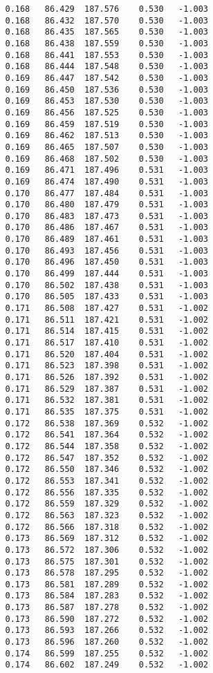\begin{verbatim}
   0.168   86.429  187.576    0.530   -1.003
   0.168   86.432  187.570    0.530   -1.003
   0.168   86.435  187.565    0.530   -1.003
   0.168   86.438  187.559    0.530   -1.003
   0.168   86.441  187.553    0.530   -1.003
   0.168   86.444  187.548    0.530   -1.003
   0.169   86.447  187.542    0.530   -1.003
   0.169   86.450  187.536    0.530   -1.003
   0.169   86.453  187.530    0.530   -1.003
   0.169   86.456  187.525    0.530   -1.003
   0.169   86.459  187.519    0.530   -1.003
   0.169   86.462  187.513    0.530   -1.003
   0.169   86.465  187.507    0.530   -1.003
   0.169   86.468  187.502    0.530   -1.003
   0.169   86.471  187.496    0.531   -1.003
   0.169   86.474  187.490    0.531   -1.003
   0.170   86.477  187.484    0.531   -1.003
   0.170   86.480  187.479    0.531   -1.003
   0.170   86.483  187.473    0.531   -1.003
   0.170   86.486  187.467    0.531   -1.003
   0.170   86.489  187.461    0.531   -1.003
   0.170   86.493  187.456    0.531   -1.003
   0.170   86.496  187.450    0.531   -1.003
   0.170   86.499  187.444    0.531   -1.003
   0.170   86.502  187.438    0.531   -1.003
   0.170   86.505  187.433    0.531   -1.003
   0.171   86.508  187.427    0.531   -1.002
   0.171   86.511  187.421    0.531   -1.002
   0.171   86.514  187.415    0.531   -1.002
   0.171   86.517  187.410    0.531   -1.002
   0.171   86.520  187.404    0.531   -1.002
   0.171   86.523  187.398    0.531   -1.002
   0.171   86.526  187.392    0.531   -1.002
   0.171   86.529  187.387    0.531   -1.002
   0.171   86.532  187.381    0.531   -1.002
   0.171   86.535  187.375    0.531   -1.002
   0.172   86.538  187.369    0.532   -1.002
   0.172   86.541  187.364    0.532   -1.002
   0.172   86.544  187.358    0.532   -1.002
   0.172   86.547  187.352    0.532   -1.002
   0.172   86.550  187.346    0.532   -1.002
   0.172   86.553  187.341    0.532   -1.002
   0.172   86.556  187.335    0.532   -1.002
   0.172   86.559  187.329    0.532   -1.002
   0.172   86.563  187.323    0.532   -1.002
   0.172   86.566  187.318    0.532   -1.002
   0.173   86.569  187.312    0.532   -1.002
   0.173   86.572  187.306    0.532   -1.002
   0.173   86.575  187.301    0.532   -1.002
   0.173   86.578  187.295    0.532   -1.002
   0.173   86.581  187.289    0.532   -1.002
   0.173   86.584  187.283    0.532   -1.002
   0.173   86.587  187.278    0.532   -1.002
   0.173   86.590  187.272    0.532   -1.002
   0.173   86.593  187.266    0.532   -1.002
   0.173   86.596  187.260    0.532   -1.002
   0.174   86.599  187.255    0.532   -1.002
   0.174   86.602  187.249    0.532   -1.002

\end{verbatim}
